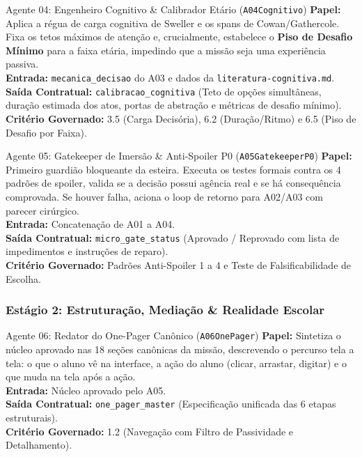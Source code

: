 \documentclass[11pt,a4paper]{article}
\begin{document}
\begin{agentbox}{Agente 04: Engenheiro Cognitivo \& Calibrador Et\'ario (\texttt{A04Cognitivo})}
\textbf{Papel:} Aplica a r\'egua de carga cognitiva de Sweller e os spans de Cowan/Gathercole. Fixa os tetos m\'aximos de aten\c{c}\~ao e, crucialmente, estabelece o \textbf{Piso de Desafio M\'inimo} para a faixa et\'aria, impedindo que a miss\~ao seja uma experi\^encia passiva.\\
\textbf{Entrada:} \texttt{mecanica\_decisao} do A03 e dados da \texttt{literatura-cognitiva.md}.\\
\textbf{Sa\'ida Contratual:} \texttt{calibracao\_cognitiva} (Teto de op\c{c}\~oes simult\^aneas, dura\c{c}\~ao estimada dos atos, portas de abstra\c{c}\~ao e m\'etricas de desafio m\'inimo).\\
\textbf{Crit\'erio Governado:} 3.5 (Carga Decis\'oria), 6.2 (Dura\c{c}\~ao/Ritmo) e 6.5 (Piso de Desafio por Faixa).
\end{agentbox}

\begin{agentbox}{Agente 05: Gatekeeper de Imers\~ao \& Anti-Spoiler P0 (\texttt{A05GatekeeperP0})}
\textbf{Papel:} Primeiro guardi\~ao bloqueante da esteira. Executa os testes formais contra os 4 padr\~oes de spoiler, valida se a decis\~ao possui ag\^encia real e se h\'a consequ\^encia comprovada. Se houver falha, aciona o loop de retorno para A02/A03 com parecer cir\'urgico.\\
\textbf{Entrada:} Concatena\c{c}\~ao de A01 a A04.\\
\textbf{Sa\'ida Contratual:} \texttt{micro\_gate\_status} (Aprovado / Reprovado com lista de impedimentos e instru\c{c}\~oes de reparo).\\
\textbf{Crit\'erio Governado:} Padr\~oes Anti-Spoiler 1 a 4 e Teste de Falsificabilidade de Escolha.
\end{agentbox}

\subsubsection{Est\'agio 2: Estrutura\c{c}\~ao, Media\c{c}\~ao \& Realidade Escolar}

\begin{agentbox}{Agente 06: Redator do One-Pager Can\^onico (\texttt{A06OnePager})}
\textbf{Papel:} Sintetiza o n\'ucleo aprovado nas 18 se\c{c}\~oes can\^onicas da miss\~ao, descrevendo o percurso tela a tela: o que o aluno v\^e na interface, a a\c{c}\~ao do aluno (clicar, arrastar, digitar) e o que muda na tela ap\'os a a\c{c}\~ao.\\
\textbf{Entrada:} N\'ucleo aprovado pelo A05.\\
\textbf{Sa\'ida Contratual:} \texttt{one\_pager\_master} (Especifica\c{c}\~ao unificada das 6 etapas estruturais).\\
\textbf{Crit\'erio Governado:} 1.2 (Navega\c{c}\~ao com Filtro de Passividade e Detalhamento).
\end{agentbox}
\end{document}

